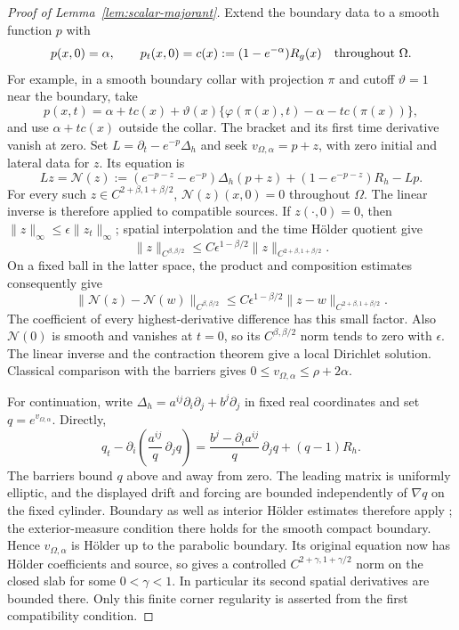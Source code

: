 \documentclass[11pt]{article}
\theoremstyle{definition}
\theoremstyle{remark}
\numberwithin{equation}{section}
\begin{document}
\begin{proof}[Proof of Lemma~\ref{lem:scalar-majorant}]
Extend the boundary data to a smooth function $p$ with
\[
 p(x,0)=\alpha,\qquad
 p_t(x,0)=c(x):=(1-e^{-\alpha})R_g(x)
 \quad\hbox{throughout }\Omega.
\]
For example, in a smooth boundary collar with projection $\pi$
and cutoff $\vartheta=1$ near the boundary, take
\[
 p(x,t)=\alpha+t c(x)
   +\vartheta(x)\{\varphi(\pi(x),t)-\alpha-tc(\pi(x))\},
\]
and use $\alpha+tc(x)$ outside the collar.  The bracket and its
first time derivative vanish at zero.
Set $L=\partial_t-e^{-p}\Delta_h$ and seek
$v_{\Omega,\alpha}=p+z$, with zero
initial and lateral data for $z$.  Its equation is
\[
 Lz=\mathcal N(z):=
  (e^{-p-z}-e^{-p})\Delta_h(p+z)
  +(1-e^{-p-z})R_h-Lp.
\]
For every such $z\in C^{2+\beta,1+\beta/2}$,
$\mathcal N(z)(x,0)=0$ throughout $\Omega$.
The linear inverse is therefore applied to compatible sources.
If $z(\cdot,0)=0$, then
$\|z\|_\infty\le\epsilon\|z_t\|_\infty$; spatial interpolation
and the time H\"older quotient give
\[
 \|z\|_{C^{\beta,\beta/2}}
 \le C\epsilon^{1-\beta/2}
       \|z\|_{C^{2+\beta,1+\beta/2}}.
\]
On a fixed ball in the latter space, the product and composition
estimates consequently give
\[
 \|\mathcal N(z)-\mathcal N(w)\|_{C^{\beta,\beta/2}}
 \le C\epsilon^{1-\beta/2}
       \|z-w\|_{C^{2+\beta,1+\beta/2}}.
\]
The coefficient of every highest-derivative difference has this
small factor.  Also $\mathcal N(0)$ is smooth and vanishes at
$t=0$, so its $C^{\beta,\beta/2}$ norm tends to zero with $\epsilon$.
The linear inverse and the contraction theorem give a local
Dirichlet solution.  Classical comparison with the barriers gives
$0\le v_{\Omega,\alpha}\le\rho+2\alpha$.

For continuation, write
$\Delta_h=a^{ij}\partial_i\partial_j+b^j\partial_j$ in fixed
real coordinates and set $q=e^{v_{\Omega,\alpha}}$.  Directly,
\[
 q_t-\partial_i\left(\frac{a^{ij}}q\,\partial_jq\right)
  =\frac{b^j-\partial_i a^{ij}}q\,\partial_jq+(q-1)R_h.
\]
The barriers bound $q$ above and away from zero.  The leading
matrix is uniformly elliptic, and the displayed drift and forcing
are bounded independently of $\nabla q$ on the fixed cylinder.
Boundary as well as interior H\"older estimates therefore apply
\cite[Chapter~III, Theorem~10.1]{LSU}; the exterior-measure
condition there holds for the smooth compact boundary.
Hence $v_{\Omega,\alpha}$ is H\"older up to the parabolic boundary.
Its original equation now has H\"older coefficients and source,
so \cite[Chapter~IV, Theorem~5.2]{LSU} gives a controlled
$C^{2+\gamma,1+\gamma/2}$ norm on the closed slab for some
$0<\gamma<1$.  In particular its second spatial derivatives are
bounded there.  Only this finite corner regularity is asserted
from the first compatibility condition.


\end{proof}
\end{document}
